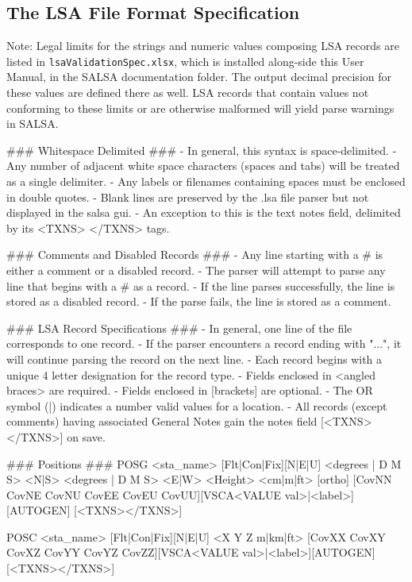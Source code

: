 \begin{landscape}
\chapter{The LSA File Format Specification}
\label{chap:LsaFormat}

Note: Legal limits for the strings and numeric values composing LSA records are listed in \verb+lsaValidationSpec.xlsx+,
which is installed along-side this User Manual, in the SALSA documentation folder. The output decimal precision for these values are defined there as well. LSA records that contain
values not conforming to these limits or are otherwise malformed will yield parse warnings in SALSA.

\begin{Snippet}
### Whitespace Delimited ### 
- In general, this syntax is space-delimited.
- Any number of adjacent white space characters (spaces and tabs) will be treated as a single delimiter.
- Any labels or filenames containing spaces must be enclosed in double quotes.
- Blank lines are preserved by the .lsa file parser but not displayed in the salsa gui.
- An exception to this is the text notes field, delimited by its <TXNS> </TXNS> tags.

### Comments and Disabled Records ###
- Any line starting with a # is either a comment or a disabled record.  
- The parser will attempt to parse any line that begins with a # as a record. 
    - If the line parses successfully, the line is stored as a disabled record.  
    - If the parse fails, the line is stored as a comment.

### LSA Record Specifications ###
- In general, one line of the file corresponds to one record.  
- If the parser encounters a record ending with "...", it will continue parsing the record on the next line.
- Each record begins with a unique 4 letter designation for the record type.
- Fields enclosed in <angled braces> are required.
- Fields enclosed in [brackets] are optional.
- The OR symbol (|) indicates a number valid values for a location.
- All records (except comments) having associated General Notes gain the notes field [<TXNS></TXNS>] on save.

### Positions ###
POSG <sta_name> [Flt|Con|Fix][N|E|U] <degrees | D M S> <N|S> <degrees | D M S> <E|W> <Height> <cm|m|ft> [ortho]
[CovNN CovNE CovNU CovEE CovEU CovUU][VSCA<VALUE val>|<label>][AUTOGEN] [<TXNS></TXNS>]

POSC <sta_name> [Flt|Con|Fix][N|E|U] <X Y Z m|km|ft>
[CovXX CovXY CovXZ CovYY CovYZ CovZZ][VSCA<VALUE val>|<label>][AUTOGEN] [<TXNS></TXNS>]


\end{Snippet}
\end{landscape}
